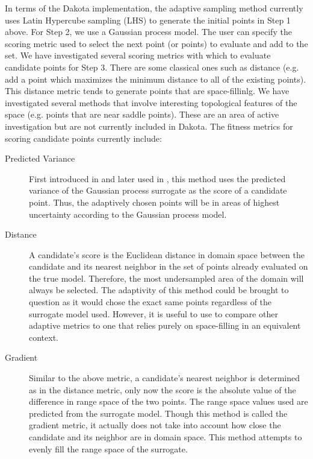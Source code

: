 In terms of the Dakota implementation, the adaptive sampling method 
currently uses Latin Hypercube sampling (LHS) to generate the initial 
points in Step 1 above. For Step 2, we use a Gaussian process model. 
The user can specify the scoring metric used to select the 
next point (or points) to evaluate and add to the set. 
We have investigated several scoring metrics with which to evaluate 
candidate points for Step 3. There are some classical ones such as distance 
(e.g. add a point which maximizes the minimum distance to all of 
the existing points). This distance metric tends to generate 
points that are space-fillinlg. We have investigated several 
methods that involve interesting topological features of the 
space (e.g. points that are near saddle points). These are 
an area of active investigation but are not currently included 
in Dakota. The fitness metrics for scoring 
candidate points currently include: 
\begin{description}
\item[Predicted Variance]
First introduced in \cite{MacKay} and later
used in \cite{Seo}, this method uses the predicted
variance of the Gaussian process surrogate as the score of a candidate 
point. Thus, the adaptively chosen points will be in areas of highest 
uncertainty according to the Gaussian process model.
\item[Distance]
A candidate's score is the Euclidean distance in domain space between the
candidate and its nearest neighbor in the set of points already evaluated on the
true model. Therefore, the most undersampled area of the domain will always be
selected. The adaptivity of this method could be brought to question as it would
chose the exact same points regardless of the surrogate model used. However, it
is useful to use to compare other adaptive metrics to one that relies purely on
space-filling in an equivalent context.
\item[Gradient]
Similar to the above metric, a candidate's nearest neighbor is determined as in
the distance metric, only now the score is the absolute value of the difference
in range space of the two points. The range space values used are predicted
from the surrogate model. Though this method is called the gradient metric, it
actually does not take into account how close the candidate and its neighbor are
in domain space. This method attempts to evenly fill the range space of the
surrogate.
\end{description}


